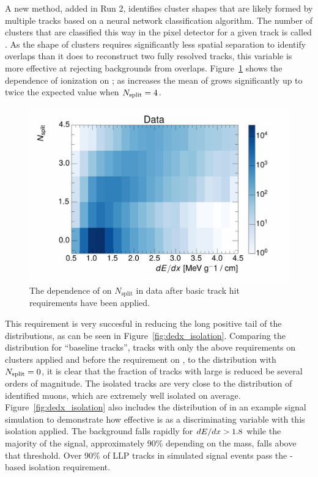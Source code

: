 A new method, added in Run 2, identifies cluster shapes that are likely formed by multiple tracks based on a neural network classification algorithm. 
The number of clusters that are classified this way in the pixel detector for a given track is called \Nsplit.
As the shape of clusters requires significantly less spatial separation to identify overlaps than it does to reconstruct two fully resolved tracks, this variable is more effective at rejecting backgrounds from overlaps.
Figure~\ref{fig:dedx_nsplit} shows the dependence of ionization on \Nsplit; as \Nsplit increases the mean of \dedx grows significantly up to twice the expected value when $N_{\mathrm{split}} = 4$. 

\begin{figure}[h]
\centering
\includegraphics[width=\fullfig]{figures/dedx_nsplit_data.pdf}
\caption{The dependence of \dedx on $N_{\mathrm{split}}$ in data after basic track hit requirements have been applied.}
\label{fig:dedx_nsplit}
\end{figure}

This requirement is very succesful in reducing the long positive tail of the \dedx distributions, as can be seen in Figure~\ref{fig:dedx_isolation}.
Comparing the distribution for ``baseline tracks'', tracks with only the above requirements on clusters applied and before the requirement on \Nsplit, to the distribution with $N_{\mathrm{split}} = 0$, it is clear that the fraction of tracks with large \dedx is reduced be several orders of magnitude.
The isolated tracks are very close to the \dedx distribution of identified muons, which are extremely well isolated on average. 
Figure~\ref{fig:dedx_isolation} also includes the distribution of \dedx in an example signal simulation to demonstrate how effective \dedx is as a discriminating variable with this isolation applied. 
The background falls rapidly for $dE/dx > 1.8$ \MeVgcm while the majority of the signal, approximately 90\% depending on the mass, falls above that threshold.
Over 90\% of \ac{LLP} tracks in simulated signal events pass the \Nsplit-based isolation requirement.


